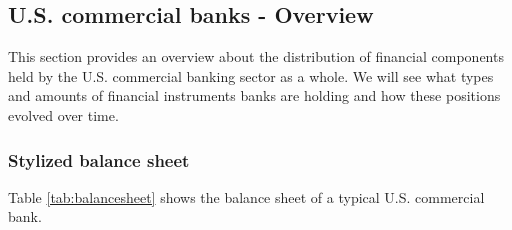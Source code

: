 \documentclass[12pt, a4paper]{article} %
\begin{document}

\subsection{U.S. commercial banks - Overview}
\label{sec:AssetLiabs}

This section provides an overview about the distribution of financial components held by the U.S. commercial banking sector as a whole. We will see what types and amounts of financial instruments banks are holding and how these positions evolved over time. 

\subsubsection{Stylized balance sheet}


Table \ref{tab:balancesheet} shows the balance sheet of a typical U.S. commercial bank.
\end{document}
